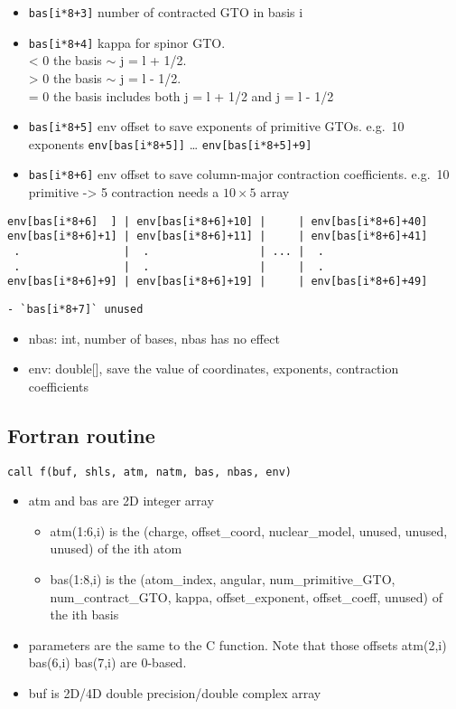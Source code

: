 \documentclass{article}
\begin{document}
\begin{itemize}
\begin{itemize}
  \item
    \verb!bas[i*8+3]! number of contracted GTO in basis i
  \item
    \verb!bas[i*8+4]! kappa for spinor GTO.\\ \textless{} 0 the basis
    \ensuremath{\sim} j = l + 1/2.\\ \textgreater{} 0 the basis
    \ensuremath{\sim} j = l - 1/2.\\ = 0 the basis includes both j = l
    + 1/2 and j = l - 1/2
  \item
    \verb!bas[i*8+5]! env offset to save exponents of primitive GTOs.
    e.g.~10 exponents \verb!env[bas[i*8+5]]! \ldots{}
    \verb!env[bas[i*8+5]+9]!
  \item
    \verb!bas[i*8+6]! env offset to save column-major contraction
    coefficients. e.g.~10 primitive -\textgreater{} 5 contraction needs
    a $10\times 5$ array
  \end{itemize}
\end{itemize}
\begin{verbatim}
env[bas[i*8+6]  ] | env[bas[i*8+6]+10] |     | env[bas[i*8+6]+40]
env[bas[i*8+6]+1] | env[bas[i*8+6]+11] |     | env[bas[i*8+6]+41]
 .                |  .                 | ... |  .                
 .                |  .                 |     |  .                
env[bas[i*8+6]+9] | env[bas[i*8+6]+19] |     | env[bas[i*8+6]+49]
\end{verbatim}
\begin{verbatim}
- `bas[i*8+7]` unused
\end{verbatim}
\begin{itemize}
\item
  nbas: int, number of bases, nbas has no effect
\item
  env: double[], save the value of coordinates, exponents,
  contraction coefficients
\end{itemize}
\subsection{Fortran routine}

\begin{verbatim}
call f(buf, shls, atm, natm, bas, nbas, env)
\end{verbatim}
\begin{itemize}
\item
  atm and bas are 2D integer array
  \begin{itemize}
  \item
    atm(1:6,i) is the (charge, offset\_coord, nuclear\_model, unused,
    unused, unused) of the ith atom
  \item
    bas(1:8,i) is the (atom\_index, angular, num\_primitive\_GTO,
    num\_contract\_GTO, kappa, offset\_exponent, offset\_coeff, unused)
    of the ith basis
  \end{itemize}
\item
  parameters are the same to the C function. Note that those offsets
  atm(2,i) bas(6,i) bas(7,i) are 0-based.
\item
  buf is 2D/4D double precision/double complex array
\end{itemize}
\end{document}
